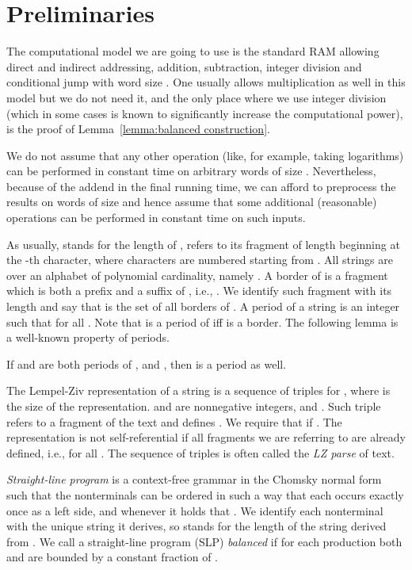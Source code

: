 \documentclass[runningheads]{llncs}
\begin{document}
\section{Preliminaries}

The computational model we are going to use is the standard RAM allowing direct and indirect addressing, addition, subtraction, integer division and conditional jump with word size . One usually allows multiplication as well in this model but we do not need it, and the only place where we use integer division (which in some cases is known to significantly increase the computational power), is the proof of Lemma~\ref{lemma:balanced construction}.

We do not assume that any other operation (like, for example, taking logarithms) can be performed in constant time on arbitrary words of size . Nevertheless, because of the  addend in the final running time, we can afford to preprocess the results on words of size  and hence assume that some additional (reasonable) operations can be performed in constant time on such inputs.

As usually,  stands for the length of ,  refers to its fragment of length  beginning at the -th character, where characters are numbered starting from . All strings are over an alphabet  of polynomial cardinality, namely .  A border of  is a fragment which is both a prefix and a suffix of , i.e., . We identify such fragment with its length and say that  is the set of all borders of . A period of a string  is an integer  such that  for all . Note that  is a period of iff  is a border. The following lemma is a well-known property of periods.

\begin{lemma}\label{lemma:periodicity}
If  and  are both periods of , and , then  is a period as well.
\end{lemma}

The Lempel-Ziv representation of a string  is a sequence of triples  for , where  is the size of the representation.  and  are nonnegative integers, and . Such triple refers to a fragment of the text  and defines . We require that  if . The representation is not self-referential if all fragments we are referring to are already defined, i.e.,  for all . The sequence of triples is often called the {\it LZ parse} of text.

{\it Straight-line program} is a context-free grammar in the Chomsky normal form such that the nonterminals  can be ordered in such a way that each  occurs exactly once as a left side, and whenever  it holds that . We identify each nonterminal with the unique string it derives, so  stands for the length of the string derived from . We call a straight-line program (SLP) {\it balanced} if for each production  both  and  are bounded by a constant fraction of .
\end{document}
